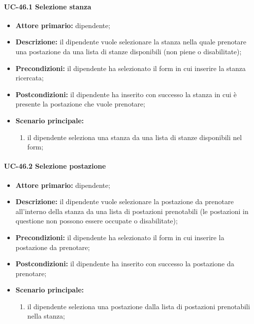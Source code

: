 \paragraph{UC-46.1 Selezione stanza}

    \begin{itemize}
	    \item \textbf{Attore primario:} dipendente;

	    \item \textbf{Descrizione:} il dipendente vuole selezionare la stanza nella quale prenotare una postazione da una lista di stanze disponibili (non piene o disabilitate);

	    \item \textbf{Precondizioni:} il dipendente ha selezionato il form in cui inserire la stanza ricercata;

	    \item \textbf{Postcondizioni:} il dipendente ha inserito con successo la stanza in cui è presente la postazione che vuole prenotare;

	    \item \textbf{Scenario principale:}
	        \begin{enumerate}
		        \item il dipendente seleziona una stanza da una lista di stanze disponibili nel form;
	        \end{enumerate}
    \end{itemize}

\paragraph{UC-46.2 Selezione postazione}

    \begin{itemize}
        \item \textbf{Attore primario:} dipendente;

        \item \textbf{Descrizione:} il dipendente vuole selezionare la postazione da prenotare all'interno della stanza da una lista di postazioni prenotabili (le postazioni in questione non possono essere occupate o disabilitate);

        \item \textbf{Precondizioni:} il dipendente ha selezionato il form in cui inserire la postazione da prenotare;

        \item \textbf{Postcondizioni:} il dipendente ha inserito con successo la postazione da prenotare;

        \item \textbf{Scenario principale:}
            \begin{enumerate}
                \item il dipendente seleziona una postazione dalla lista di postazioni prenotabili  nella stanza;
            \end{enumerate}
    \end{itemize}

